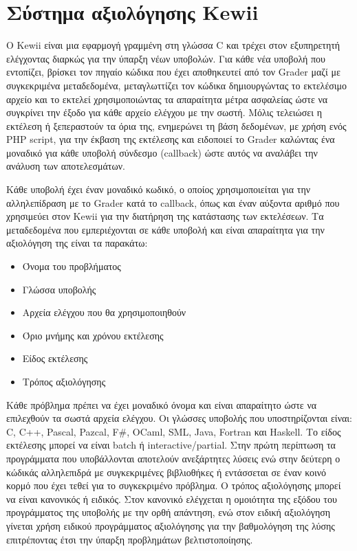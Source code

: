 \documentclass[diploma]{softlab-thesis}
\begin{document}
\section{Σύστημα αξιολόγησης Kewii}

Ο Kewii είναι μια εφαρμογή γραμμένη στη γλώσσα C και τρέχει στον εξυπηρετητή
ελέγχοντας διαρκώς για την ύπαρξη νέων υποβολών. Για κάθε νέα υποβολή που εντοπίζει,
βρίσκει τον πηγαίο κώδικα που έχει αποθηκευτεί από τον Grader μαζί με συγκεκριμένα
μεταδεδομένα, μεταγλωττίζει τον κώδικα δημιουργώντας το εκτελέσιμο αρχείο και το
εκτελεί χρησιμοποιώντας τα απαραίτητα μέτρα ασφαλείας ώστε να συγκρίνει την έξοδο
για κάθε αρχείο ελέγχου με την σωστή. Μόλις τελειώσει η εκτέλεση ή ξεπεραστούν τα
όρια της, ενημερώνει τη βάση δεδομένων, με χρήση ενός PHP script, για την έκβαση της
εκτέλεσης και ειδοποιεί το Grader καλώντας ένα μοναδικό για κάθε υποβολή σύνδεσμο
(callback) ώστε αυτός να αναλάβει την ανάλυση των αποτελεσμάτων.

\bigskip

Κάθε υποβολή έχει έναν μοναδικό κωδικό, ο οποίος χρησιμοποιείται για την
αλληλεπίδραση με το Grader κατά το callback, όπως και έναν αύξοντα αριθμό που
χρησιμεύει στον Kewii για την διατήρηση της κατάστασης των εκτελέσεων. Τα
μεταδεδομένα που εμπεριέχονται σε κάθε υποβολή και είναι απαραίτητα για την
αξιολόγηση της είναι τα παρακάτω:

\begin{itemize}
  \item Όνομα του προβλήματος
  \item Γλώσσα υποβολής
  \item Αρχεία ελέγχου που θα χρησιμοποιηθούν
  \item Όριο μνήμης και χρόνου εκτέλεσης
  \item Είδος εκτέλεσης
  \item Τρόπος αξιολόγησης
\end{itemize}

Κάθε πρόβλημα πρέπει να έχει μοναδικό όνομα και είναι απαραίτητο ώστε να
επιλεχθούν τα σωστά αρχεία ελέγχου. Οι γλώσσες υποβολής που υποστηρίζονται
είναι: C, C++, Pascal, Pazcal, F\#, OCaml, SML, Java, Fortran και Haskell. Το
είδος εκτέλεσης μπορεί να είναι batch ή interactive/partial. Στην πρώτη
περίπτωση τα προγράμματα που υποβάλλονται αποτελούν ανεξάρτητες λύσεις ενώ στην
δεύτερη ο κώδικάς αλληλεπιδρά με συγκεκριμένες βιβλιοθήκες ή εντάσσεται σε έναν
κοινό κορμό που έχει τεθεί για το συγκεκριμένο πρόβλημα. Ο τρόπος αξιολόγησης
μπορεί να είναι κανονικός ή ειδικός. Στον κανονικό ελέγχεται η ομοιότητα της
εξόδου του προγράμματος της υποβολής με την ορθή απάντηση, ενώ στον ειδική
αξιολόγηση γίνεται χρήση ειδικού προγράμματος αξιολόγησης για την βαθμολόγηση
της λύσης επιτρέποντας έτσι την ύπαρξη προβλημάτων βελτιστοποίησης.
\end{document}
